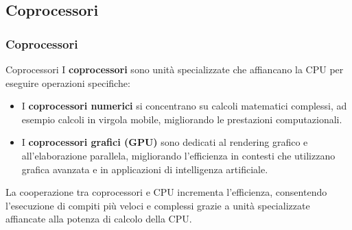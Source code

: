 \subsection[Coprocessori]{Coprocessori}
\begin{frame}
	\frametitle{ Coprocessori}
	
	\begin{block}{Coprocessori}
		I \textbf{coprocessori} sono unità specializzate che affiancano la CPU per eseguire operazioni specifiche:
		\begin{itemize}
			\item I \textbf{coprocessori numerici} si concentrano su calcoli matematici complessi, ad esempio calcoli in virgola mobile, migliorando le prestazioni computazionali. 
			\item I \textbf{coprocessori grafici (GPU)} sono dedicati al rendering grafico e all'elaborazione parallela, migliorando l'efficienza in contesti che utilizzano grafica avanzata e in applicazioni di intelligenza artificiale. 
		\end{itemize}
		
		La cooperazione tra coprocessori e CPU incrementa l'efficienza, consentendo l'esecuzione di compiti più veloci e complessi grazie a unità specializzate affiancate alla potenza di calcolo della CPU.
	\end{block}
	
\end{frame}


